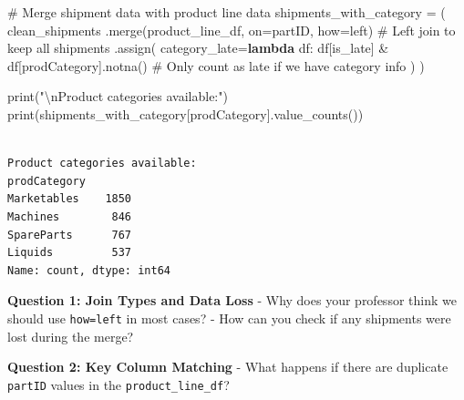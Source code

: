 \documentclass[
  letterpaper,
  DIV=11,
  numbers=noendperiod]{scrartcl}
\newenvironment{Shaded}{\begin{snugshade}}{\end{snugshade}}
\newcommand{\BuiltInTok}[1]{\textcolor[rgb]{0.00,0.23,0.31}{#1}}
\newcommand{\CharTok}[1]{\textcolor[rgb]{0.13,0.47,0.30}{#1}}
\newcommand{\CommentTok}[1]{\textcolor[rgb]{0.37,0.37,0.37}{#1}}
\newcommand{\KeywordTok}[1]{\textcolor[rgb]{0.00,0.23,0.31}{\textbf{#1}}}
\newcommand{\NormalTok}[1]{\textcolor[rgb]{0.00,0.23,0.31}{#1}}
\newcommand{\OperatorTok}[1]{\textcolor[rgb]{0.37,0.37,0.37}{#1}}
\newcommand{\StringTok}[1]{\textcolor[rgb]{0.13,0.47,0.30}{#1}}
\begin{document}
\label{mental-model-6-merge-prep}
\begin{Shaded}
\begin{Highlighting}[]
\CommentTok{\# Merge shipment data with product line data}
\NormalTok{shipments\_with\_category }\OperatorTok{=}\NormalTok{ (}
\NormalTok{    clean\_shipments}
\NormalTok{    .merge(product\_line\_df, on}\OperatorTok{=}\StringTok{\textquotesingle{}partID\textquotesingle{}}\NormalTok{, how}\OperatorTok{=}\StringTok{\textquotesingle{}left\textquotesingle{}}\NormalTok{)  }\CommentTok{\# Left join to keep all shipments}
\NormalTok{    .assign(}
\NormalTok{        category\_late}\OperatorTok{=}\KeywordTok{lambda}\NormalTok{ df: df[}\StringTok{\textquotesingle{}is\_late\textquotesingle{}}\NormalTok{] }\OperatorTok{\&}\NormalTok{ df[}\StringTok{\textquotesingle{}prodCategory\textquotesingle{}}\NormalTok{].notna()  }\CommentTok{\# Only count as late if we have category info}
\NormalTok{    )}
\NormalTok{)}

\BuiltInTok{print}\NormalTok{(}\StringTok{"}\CharTok{\textbackslash{}n}\StringTok{Product categories available:"}\NormalTok{)}
\BuiltInTok{print}\NormalTok{(shipments\_with\_category[}\StringTok{\textquotesingle{}prodCategory\textquotesingle{}}\NormalTok{].value\_counts())}
\end{Highlighting}
\end{Shaded}

\begin{verbatim}

Product categories available:
prodCategory
Marketables    1850
Machines        846
SpareParts      767
Liquids         537
Name: count, dtype: int64
\end{verbatim}

\begin{tcolorbox}[enhanced jigsaw, bottomtitle=1mm, opacitybacktitle=0.6, toptitle=1mm, colbacktitle=quarto-callout-important-color!10!white, breakable, coltitle=black, bottomrule=.15mm, left=2mm, colframe=quarto-callout-important-color-frame, colback=white, title=\textcolor{quarto-callout-important-color}{\faExclamation}\hspace{0.5em}{🤔 Discussion Questions: Merge Mental Model}, leftrule=.75mm, arc=.35mm, rightrule=.15mm, opacityback=0, toprule=.15mm, titlerule=0mm]

\textbf{Question 1: Join Types and Data Loss} - Why does your professor
think we should use
\texttt{how=\textquotesingle{}left\textquotesingle{}} in most cases? -
How can you check if any shipments were lost during the merge?

\textbf{Question 2: Key Column Matching} - What happens if there are
duplicate \texttt{partID} values in the \texttt{product\_line\_df}?

\end{tcolorbox}
\end{document}
